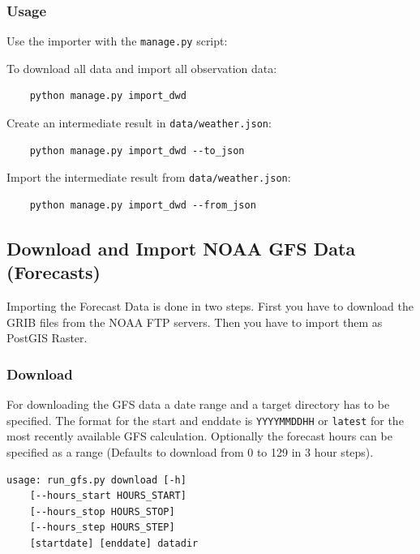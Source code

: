 \documentclass[paper=a4, fontsize=11pt]{article} %
\numberwithin{equation}{section} %
\numberwithin{figure}{section} %
\numberwithin{table}{section} %
\begin{document}
\subsubsection*{Usage}\label{usage-1}

Use the importer with the \texttt{manage.py} script:

To download all data and import all observation data:

\begin{lstlisting}
	python manage.py import_dwd
\end{lstlisting}


Create an intermediate result in \texttt{data/weather.json}:

\begin{lstlisting}
	python manage.py import_dwd --to_json
\end{lstlisting}


Import the intermediate result from \texttt{data/weather.json}:

\begin{lstlisting}
	python manage.py import_dwd --from_json
\end{lstlisting}


\subsection{Download and Import NOAA GFS Data
(Forecasts)}\label{download-and-import-noaa-gfs-data-forecasts}

Importing the Forecast Data is done in two steps. First you have to
download the GRIB files from the NOAA FTP servers. Then you have to
import them as PostGIS Raster.

\subsubsection*{Download}\label{download}

For downloading the GFS data a date range and a target directory has to be specified. The format for the start and enddate is \texttt{YYYYMMDDHH} or \texttt{latest} for the most recently available GFS calculation. Optionally the forecast hours can be specified as a range (Defaults to download from 0 to 129 in 3 hour steps).

\begin{lstlisting}
usage: run_gfs.py download [-h]
	[--hours_start HOURS_START]
    [--hours_stop HOURS_STOP]
    [--hours_step HOURS_STEP]
    [startdate] [enddate] datadir
\end{lstlisting}
\end{document}
